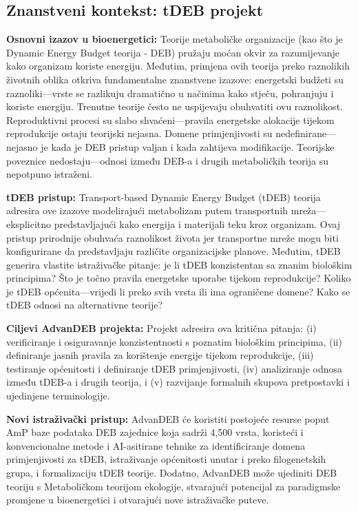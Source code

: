 \documentclass[12pt,a4paper]{article}
\begin{document}
\subsection{Znanstveni kontekst: tDEB projekt}

\textbf{Osnovni izazov u bioenergetici:} Teorije metaboličke organizacije (kao što je Dynamic Energy Budget teorija - DEB) pružaju moćan okvir za razumijevanje kako organizam koriste energiju. Međutim, primjena ovih teorija preko raznolikih životnih oblika otkriva fundamentalne znanstvene izazove: energetski budžeti su raznoliki—vrste se razlikuju dramatično u načinima kako stječu, pohranjuju i koriste energiju. Trenutne teorije često ne uspijevaju obuhvatiti ovu raznolikost. Reproduktivni procesi su slabo shvaćeni—pravila energetske alokacije tijekom reprodukcije ostaju teorijski nejasna. Domene primjenjivosti su nedefinirane—nejasno je kada je DEB pristup valjan i kada zahtijeva modifikacije. Teorijske poveznice nedostaju—odnosi između DEB-a i drugih metaboličkih teorija su nepotpuno istraženi.

\textbf{tDEB pristup:} Transport-based Dynamic Energy Budget (tDEB) teorija adresira ove izazove modelirajući metabolizam putem transportnih mreža—eksplicitno predstavljajući kako energija i materijali teku kroz organizam. Ovaj pristup prirodnije obuhvaća raznolikost života jer transportne mreže mogu biti konfigurirane da predstavljaju različite organizacijske planove. Međutim, tDEB generira vlastite istraživačke pitanje: je li tDEB konzistentan sa znanim biološkim principima? Što je točno pravila energetske uporabe tijekom reprodukcije? Koliko je tDEB općenita—vrijedi li preko svih vrsta ili ima ograničene domene? Kako se tDEB odnosi na alternativne teorije?

\textbf{Ciljevi AdvanDEB projekta:} Projekt adresira ova kritična pitanja: (i) verificiranje i osiguravanje konzistentnosti s poznatim biološkim principima, (ii) definiranje jasnih pravila za korištenje energije tijekom reprodukcije, (iii) testiranje općenitosti i definiranje tDEB primjenjivosti, (iv) analiziranje odnosa između tDEB-a i drugih teorija, i (v) razvijanje formalnih skupova pretpostavki i ujedinjene terminologije.

\textbf{Novi istraživački pristup:} AdvanDEB će koristiti postojeće resurse poput AmP baze podataka DEB zajednice koja sadrži 4,500 vrsta, koristeći i konvencionalne metode i AI-asitirane tehnike za identificiranje domena primjenjivosti za tDEB, istraživanje općenitosti unutar i preko filogenetskih grupa, i formalizaciju tDEB teorije. Dodatno, AdvanDEB može ujediniti DEB teoriju s Metaboličkom teorijom ekologije, stvarajući potencijal za paradigmske promjene u bioenergetici i otvarajući nove istraživačke puteve.
\end{document}
